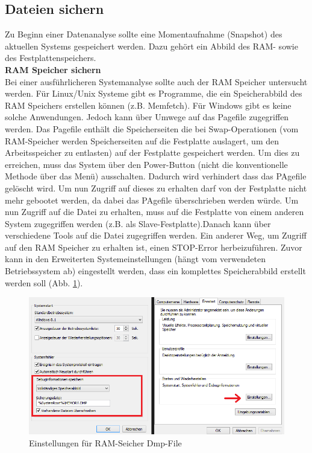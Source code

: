 \subsection{Dateien sichern}
Zu Beginn einer Datenanalyse sollte eine Momentaufnahme (Snapshot) des aktuellen Systems gespeichert werden. Dazu gehört ein Abbild des RAM- sowie des Festplattenspeichers.\\

\noindent\textbf{RAM Speicher sichern}\\
\noindent Bei einer ausführlicheren Systemanalyse sollte auch der RAM Speicher untersucht werden. Für Linux/Unix Systeme gibt es Programme, die ein Speicherabbild des RAM Speichers erstellen können (z.B. Memfetch). Für Windows gibt es keine solche Anwendungen. Jedoch kann über Umwege auf das Pagefile zugegriffen werden. Das Pagefile enthält die Speicherseiten die bei Swap-Operationen (vom RAM-Speicher werden Speicherseiten auf die Festplatte auslagert, um den Arbeitsspeicher zu entlasten) auf der Festplatte gespeichert werden. Um dies zu erreichen, muss das System über den Power-Button (nicht die konventionelle Methode über das Menü) ausschalten. Dadurch wird verhindert dass das PAgefile gelöscht wird. Um nun Zugriff auf dieses zu erhalten darf von der Festplatte nicht mehr gebootet werden, da dabei das PAgefile überschrieben werden würde. Um nun Zugriff auf die Datei zu erhalten, muss auf die Festplatte von einem anderen System zugegriffen werden (z.B. als Slave-Festplatte).Danach kann über verschiedene Tools auf die Datei zugegriffen werden. 
Ein anderer Weg, um Zugriff auf den RAM Speicher zu erhalten ist, einen STOP-Error herbeizuführen. Zuvor kann in den Erweiterten Systemeinstellungen (hängt vom verwendeten Betriebssystem ab) eingestellt werden, dass ein komplettes Speicherabbild erstellt werden soll (Abb. \ref{ram}).\\

\begin{figure}[h]
    \centering\includegraphics[scale=0.7]{Bilder/RAM.png}
  \caption{Einstellungen für RAM-Seicher Dmp-File}
  \label{ram}
\end{figure}

